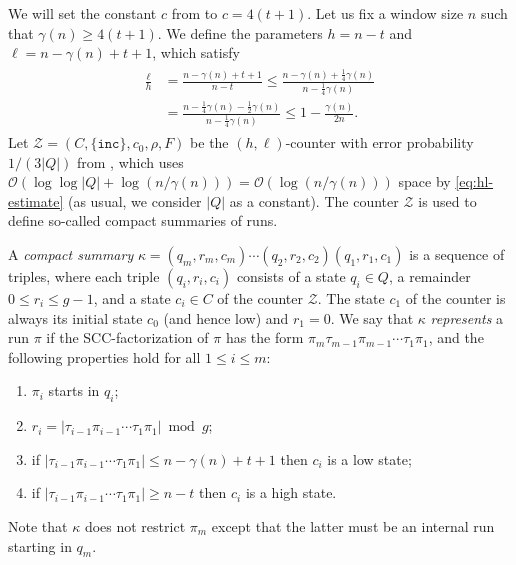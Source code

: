 \documentclass{article}\usepackage[a4paper,margin=20mm]{geometry}
\renewcommand{\O}{\mathcal{O}}
\newcommand{\BZ}{\mathcal{Z}}
\renewcommand{\geq}{\geqslant}
\renewcommand{\leq}{\leqslant}
\renewcommand{\ge}{\geq}
\renewcommand{\le}{\leq}
\begin{document}
We will set the constant $c$ from  to $c = 4(t+1)$.
Let us fix a window size $n$ such that $\gamma(n) \ge 4(t+1)$.
We define the parameters $h = n - t$ and $\ell = n - \gamma(n) + t + 1$, which satisfy
\begin{align}
\begin{split}
	\label{eq:hl-estimate}
	\frac{\ell}{h} &= \frac{n - \gamma(n) + t + 1}{n - t} \le \frac{n - \gamma(n) + \frac{1}{4}\gamma(n)}{n - \frac{1}{4} \gamma(n)}  \\
	&= \frac{n - \frac{1}{4}\gamma(n) - \frac{1}{2}\gamma(n)}{n - \frac{1}{4} \gamma(n)} \leq 1 -   \frac{\gamma(n)}{2n}.
\end{split}
\end{align}
Let $\BZ = (C,\{\mathtt{inc}\},c_0,\rho,F)$ be the $(h,\ell)$-counter with error probability $1/(3|Q|)$ from ,
which uses $\O(\log\log |Q| + \log(n/\gamma(n))) = \O(\log(n/\gamma(n)))$ space by \eqref{eq:hl-estimate} (as usual, we consider
$|Q|$ as a constant).
The counter $\BZ$ is used to define so-called compact summaries of runs. 

A {\em compact summary} $\kappa = (q_m, r_m, c_m) \cdots (q_2, r_2, c_2) (q_1, r_1, c_1)$ is a sequence of triples,
where each triple $(q_i, r_i, c_i)$ consists of a state $q_i \in Q$, a remainder $0 \le r_i \le g-1$,
and a state $c_i \in C$ of the counter $\BZ$. The state $c_1$ of the counter is always its initial state $c_0$ (and hence low)
and $r_1 = 0$.
We say that $\kappa$ {\em represents} a run $\pi$ if
the SCC-factorization of $\pi$ has the form $\pi_m \tau_{m-1} \pi_{m-1} \cdots \tau_1 \pi_1$,
and the following properties hold for all $1 \le i \le m$:
\begin{enumerate}[label=(C\arabic{*}), ref=(C\arabic{*})]
\item $\pi_i$ starts in $q_i$; \label{C1}
\item $r_i = |\tau_{i-1} \pi_{i-1} \cdots \tau_1 \pi_1| \bmod {g}$; \label{C2}
\item if $|\tau_{i-1} \pi_{i-1} \cdots \tau_1 \pi_1| \le n - \gamma(n) + t + 1$
then $c_i$ is a low state;\label{C3}
\item if $|\tau_{i-1} \pi_{i-1} \cdots \tau_1 \pi_1| \ge n-t$ then $c_i$ is a high state. \label{C4}
\end{enumerate}
Note that $\kappa$ does not restrict $\pi_m$ except that the latter must be an internal run
starting in $q_m$.
\end{document}
